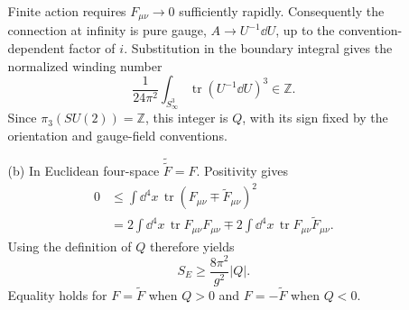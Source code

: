 \begin{enumerate}
\begin{enumerate}
    Finite action requires \(F_{\mu\nu}\to0\) sufficiently rapidly.
    Consequently the connection at infinity is pure gauge,
    \(A\to U^{-1}\dd U\), up to the convention-dependent factor of \(i\).
    Substitution in the boundary integral gives the normalized winding
    number
    \[
      \frac1{24\pi^2}\int_{S^3_\infty}
         \operatorname{tr}(U^{-1}\dd U)^3\in\mathbb Z.
    \]
    Since \(\pi_3(SU(2))=\mathbb Z\), this integer is \(Q\), with its sign
    fixed by the orientation and gauge-field conventions.
    \item[(b)]
    In Euclidean four-space \(\widetilde{\widetilde F}=F\).  Positivity
    gives
    \[
    \begin{split}
      0&\le\int \dd^4x\,
         \operatorname{tr}(F_{\mu\nu}\mp\widetilde F_{\mu\nu})^2\\
       &=2\int \dd^4x\,\operatorname{tr}F_{\mu\nu}F_{\mu\nu}
         \mp2\int \dd^4x\,
            \operatorname{tr}F_{\mu\nu}\widetilde F_{\mu\nu}.
    \end{split}
    \]
    Using the definition of \(Q\) therefore yields
    \[
      S_E\ge\frac{8\pi^2}{g^2}\lvert Q\rvert.
    \]
    Equality holds for \(F=\widetilde F\) when \(Q>0\) and
    \(F=-\widetilde F\) when \(Q<0\).


\end{enumerate}
\end{enumerate}

